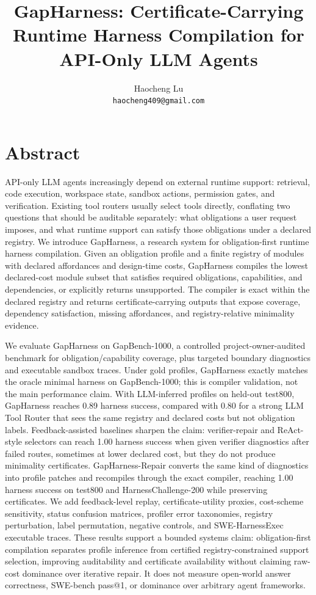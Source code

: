 \documentclass[
  10pt,
]{article}
\title{GapHarness: Certificate-Carrying Runtime Harness Compilation for
API-Only LLM Agents}
\author{Haocheng Lu\\
\nolinkurl{haocheng409@gmail.com}}
\date{}
\begin{document}
\maketitle

\section{Abstract}\label{abstract}

API-only LLM agents increasingly depend on external runtime support:
retrieval, code execution, workspace state, sandbox actions, permission
gates, and verification. Existing tool routers usually select tools
directly, conflating two questions that should be auditable separately:
what obligations a user request imposes, and what runtime support can
satisfy those obligations under a declared registry. We introduce
GapHarness, a research system for obligation-first runtime harness
compilation. Given an obligation profile and a finite registry of
modules with declared affordances and design-time costs, GapHarness
compiles the lowest declared-cost module subset that satisfies required
obligations, capabilities, and dependencies, or explicitly returns
unsupported. The compiler is exact within the declared registry and
returns certificate-carrying outputs that expose coverage, dependency
satisfaction, missing affordances, and registry-relative minimality
evidence.

We evaluate GapHarness on GapBench-1000, a controlled
project-owner-audited benchmark for obligation/capability coverage, plus
targeted boundary diagnostics and executable sandbox traces. Under gold
profiles, GapHarness exactly matches the oracle minimal harness on
GapBench-1000; this is compiler validation, not the main performance
claim. With LLM-inferred profiles on held-out test800, GapHarness
reaches 0.89 harness success, compared with 0.80 for a strong LLM Tool
Router that sees the same registry and declared costs but not obligation
labels. Feedback-assisted baselines sharpen the claim: verifier-repair
and ReAct-style selectors can reach 1.00 harness success when given
verifier diagnostics after failed routes, sometimes at lower declared
cost, but they do not produce minimality certificates. GapHarness-Repair
converts the same kind of diagnostics into profile patches and
recompiles through the exact compiler, reaching 1.00 harness success on
test800 and HarnessChallenge-200 while preserving certificates. We add
feedback-level replay, certificate-utility proxies, cost-scheme
sensitivity, status confusion matrices, profiler error taxonomies,
registry perturbation, label permutation, negative controls, and
SWE-HarnessExec executable traces. These results support a bounded
systems claim: obligation-first compilation separates profile inference
from certified registry-constrained support selection, improving
auditability and certificate availability without claiming raw-cost
dominance over iterative repair. It does not measure open-world answer
correctness, SWE-bench pass@1, or dominance over arbitrary agent
frameworks.
\end{document}

